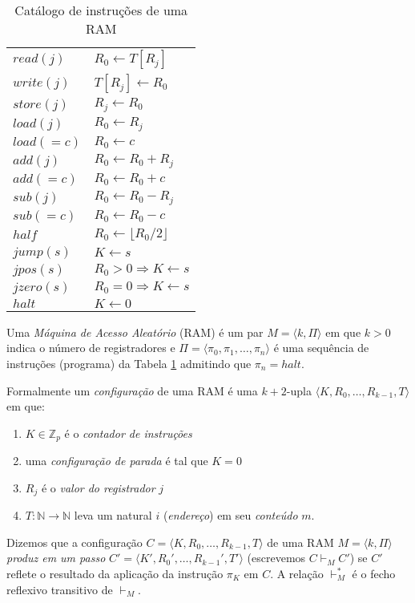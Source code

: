 \begin{table}
  \label{tab:instrucoes}
  \centering
  \begin{tabular}{|ll|}
    \hline
    $read(j)$ & $R_0 \leftarrow T[R_j]$\\
    $write(j)$ & $T[R_j] \leftarrow R_0$\\
    $store(j)$ & $R_j \leftarrow R_0$\\
    $load(j)$ & $R_0 \leftarrow R_j$\\
    $load(=c)$ & $R_0 \leftarrow c$\\
    $add(j)$ & $R_0 \leftarrow R_0 + R_j$\\
    $add(=c)$ & $R_0 \leftarrow R_0 + c$\\
    $sub(j)$ & $R_0 \leftarrow R_0 - R_j$\\
    $sub(=c)$ & $R_0 \leftarrow R_0 - c$\\
    $half$ & $R_0 \leftarrow \lfloor R_0/2 \rfloor$\\
    $jump(s)$ & $K \leftarrow s$\\
    $jpos(s)$ & $R_0 > 0 \Rightarrow K \leftarrow s$\\
    $jzero(s)$ & $R_0 = 0 \Rightarrow K \leftarrow s$\\
    $halt$ & $K \leftarrow 0$\\
    \hline
  \end{tabular}
  \caption{Catálogo de instruções de uma RAM}
\end{table}

Uma {\em Máquina de Acesso Aleatório} (RAM) é um par $M = \langle k, \Pi\rangle$ em que $k > 0$ indica o número de registradores e $\Pi = \langle \pi_0, \pi_1, \dots, \pi_n \rangle$ é uma sequência de instruções (programa) da Tabela \ref{tab:instrucoes} admitindo que $\pi_n = halt$. 

Formalmente um {\em configuração} de uma RAM é uma $k+2$-upla $\langle K, R_0, \dots, R_{k-1}, T\rangle$ em que:
\begin{enumerate}
\item $K \in \mathbb{Z}_p$ é o {\em contador de instruções}
\item uma {\em configuração de parada} é tal que $K = 0$
\item $R_j$ é o {\em valor do registrador} $j$
\item $T: \mathbb{N} \to \mathbb{N}$ leva um natural $i$ ({\em endereço}) em seu {\em conteúdo} $m$.
\end{enumerate}

Dizemos que a configuração $C = \langle K, R_0, \dots, R_{k-1}, T\rangle$ de uma RAM $M = \langle k, \Pi\rangle$ {\em produz em um passo} $C' = \langle K', R_0', \dots, R_{k-1}', T'\rangle$ (escrevemos $C \vdash_M C'$) se $C'$ reflete o resultado da aplicação da instrução $\pi_K$ em $C$.
A relação $\vdash_M^*$ é o fecho reflexivo transitivo de $\vdash_M$.

